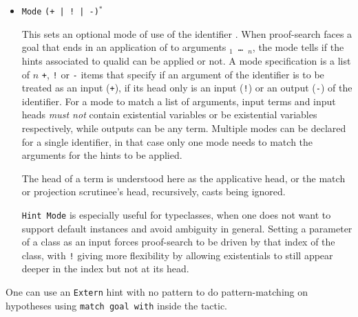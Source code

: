 \begin{coq_example*}
\begin{itemize}
The \texttt{emp} regexp does not match any search path while
\texttt{eps} matches the empty path. During proof search, the path of
successive successful hints on a search branch is recorded, as a list of
identifiers for the hints (note \texttt{Hint Extern}'s do not have an
associated identifier). Before applying any hint $\ident$ the current
path $p$ extended with $\ident$ is matched against the current cut
expression $c$ associated to the hint database. If matching succeeds,
the hint is \emph{not} applied. The semantics of \texttt{Hint Cut} $e$
is to set the cut expression to $c | e$, the initial cut expression
being \texttt{emp}.


\item \texttt{Mode} {\tt (+ | ! | -)}$^*$ {\qualid}
\label{HintMode}

This sets an optional mode of use of the identifier {\qualid}.  When
proof-search faces a goal that ends in an application of {\qualid} to
arguments {\tt \term$_1$ \mbox{\dots} \term$_n$}, the mode tells if the
hints associated to qualid can be applied or not. A mode specification
is a list of $n$ {\tt +}, {\tt !} or {\tt -} items that specify if an
argument of the identifier is to be treated as an input ({\tt +}), if
its head only is an input ({\tt !}) or an output ({\tt -}) of the
identifier. For a mode to match a list of arguments, input terms and
input heads \emph{must not} contain existential variables or be
existential variables respectively, while outputs can be any
term. Multiple modes can be declared for a single identifier, in that
case only one mode needs to match the arguments for the hints to be
applied.

The head of a term is understood here as the applicative head, or the
match or projection scrutinee's head, recursively, casts being ignored.

{\tt Hint Mode} is especially useful for typeclasses, when one does not
want to support default instances and avoid ambiguity in
general. Setting a parameter of a class as an input forces proof-search
to be driven by that index of the class, with {\tt !} giving more
flexibility by allowing existentials to still appear deeper in the index
but not at its head.

\end{itemize}

\Rem One can use an \texttt{Extern} hint with no pattern to do
pattern-matching on hypotheses using \texttt{match goal with} inside
the tactic.



\end{coq_example*}
